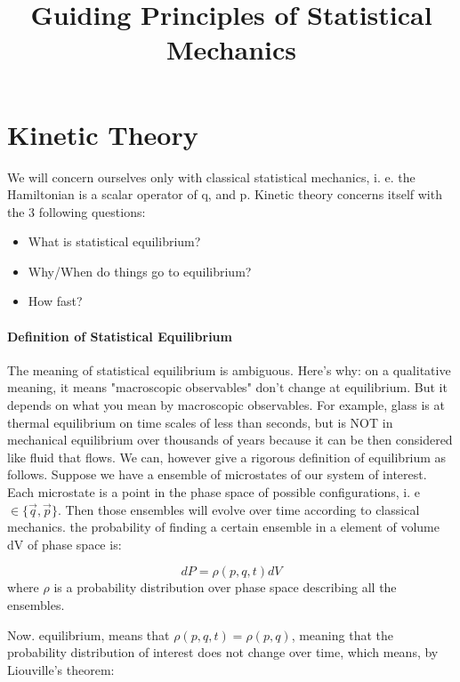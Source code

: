 
\title{Guiding Principles of Statistical Mechanics}

\maketitle

\section{Kinetic Theory}

We will concern ourselves only with classical statistical mechanics, i. e. the Hamiltonian is a scalar operator of q, and p.  Kinetic theory concerns itself with the 3 following questions:


\begin{itemize}
\item What is statistical equilibrium?
\item Why/When do things go to equilibrium?
\item How fast?
\end{itemize}

\paragraph{Definition of Statistical Equilibrium}

The meaning of statistical equilibrium is ambiguous.  Here's why:  on a qualitative meaning, it means "macroscopic observables" don't change at equilibrium.  But it depends on what you mean by macroscopic observables.  For example, glass is at thermal equilibrium on time scales of less than seconds, but is NOT in mechanical equilibrium over thousands of years because it can be then considered like fluid that flows.  We can, however give a rigorous definition of equilibrium as follows.  Suppose we have a ensemble of microstates of our system of interest.  Each microstate is a point in the phase space of possible configurations, i. e $\in \{ \vec{q}, \vec{p} \}$.  Then those ensembles will evolve over time according to classical mechanics.  the probability of finding a certain ensemble in a element of volume dV of phase space is:

$$ dP = \rho(p, q,t)dV$$
where $\rho$ is a probability distribution over phase space describing all the ensembles.

Now. equilibrium, means that $\rho(p,q,t)= \rho(p,q)$, meaning that the probability distribution of interest does not change over time, which means, by Liouville's theorem:

